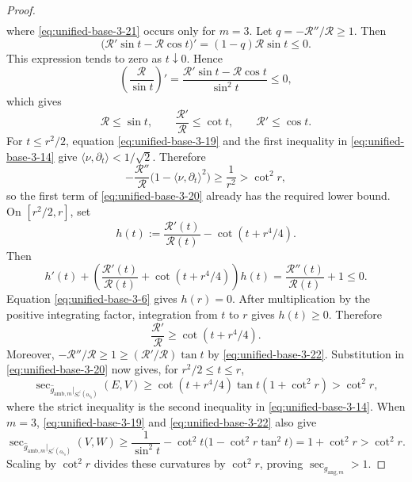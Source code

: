 \documentclass[11pt,reqno]{amsart}
\theoremstyle{definition}
\numberwithin{equation}{section}
\begin{document}
\begin{proof}
\begin{align}
\end{align}
where \eqref{eq:unified-base-3-21} occurs only for $m=3$.  Let
\(q=-\mathcal R''/\mathcal R\geq1\).  Then
\[
 \bigl(\mathcal R'\sin t-\mathcal R\cos t\bigr)'
   =(1-q)\mathcal R\sin t\leq0 .
\]
This expression tends to zero as \(t\downarrow0\).  Hence
\[
 \left(\frac{\mathcal R}{\sin t}\right)'
 =\frac{\mathcal R'\sin t-\mathcal R\cos t}{\sin^2t}\leq0,
\]
which gives
\begin{equation}
\mathcal R\le\sin t,\qquad
 \frac{\mathcal R'}{\mathcal R}\le\cot t,\qquad
 \mathcal R'\le\cos t.                                          \label{eq:unified-base-3-22}
\end{equation}
For $t\le r^2/2$, equation \eqref{eq:unified-base-3-19} and the first inequality in
\eqref{eq:unified-base-3-14} give $\langle\nu,\partial_t\rangle<1/\sqrt2$.
Therefore
\[
 -\frac{\mathcal R''}{\mathcal R}
       \bigl(1-\langle\nu,\partial_t\rangle^2\bigr)
 \ge\frac1{r^2}>\cot^2r,
\]
so the first term of \eqref{eq:unified-base-3-20} already has the required lower
bound.  On \([r^2/2,r]\), set
\[
 h(t):=\frac{\mathcal R'(t)}{\mathcal R(t)}
             -\cot(t+r^4/4).
\]
Then
\[
 h'(t)+\left(
 \frac{\mathcal R'(t)}{\mathcal R(t)}
             +\cot(t+r^4/4)\right)h(t)
 =\frac{\mathcal R''(t)}{\mathcal R(t)}+1\leq0.
\]
Equation \eqref{eq:unified-base-3-6} gives \(h(r)=0\).
After multiplication by the positive integrating factor, integration
from \(t\) to \(r\) gives \(h(t)\geq0\).  Therefore
\[
 \frac{\mathcal R'}{\mathcal R}\ge\cot(t+r^4/4).
\]
Moreover,
$-\mathcal R''/\mathcal R\ge1\ge
(\mathcal R'/\mathcal R)\tan t$ by \eqref{eq:unified-base-3-22}.  Substitution in
\eqref{eq:unified-base-3-20} now gives, for $r^2/2\le t\le r$,
\begin{equation}
\sec_{\widehat g_{\mathrm{amb},m}|_{S_r^{\angle}(o_{z_0})}}(E,V)
 \ge\cot(t+r^4/4)\tan t(1+\cot^2r)>\cot^2r,                      \label{eq:unified-base-3-23}
\end{equation}
where the strict inequality is the second inequality in
\eqref{eq:unified-base-3-14}.
When $m=3$, \eqref{eq:unified-base-3-19} and \eqref{eq:unified-base-3-22} also give
\begin{equation}
\sec_{\widehat g_{\mathrm{amb},m}|_{S_r^{\angle}(o_{z_0})}}(V,W)
 \ge\frac1{\sin^2t}
      -\cot^2t\bigl(1-\cot^2r\tan^2t\bigr)
 =1+\cot^2r>\cot^2r.                                              \label{eq:unified-base-3-24}
\end{equation}
Scaling by $\cot^2r$ divides these curvatures by $\cot^2r$, proving
$\sec_{g_{\mathrm{ang},m}}>1$.


\end{proof}
\end{document}
